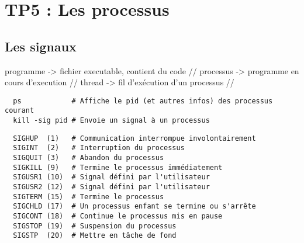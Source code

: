 \documentclass{article}
\begin{document}
\section{TP5 : Les processus}

\subsection{Les signaux}

programme -> fichier executable, contient du code //
processus -> programme en cours d'execution //
thread -> fil d'exécution d'un processus //

\begin{verbatim}
  ps            # Affiche le pid (et autres infos) des processus courant
  kill -sig pid # Envoie un signal à un processus
\end{verbatim}

\begin{verbatim}
  SIGHUP  (1)   # Communication interrompue involontairement
  SIGINT  (2)   # Interruption du processus
  SIGQUIT (3)   # Abandon du processus
  SIGKILL (9)   # Termine le processus immédiatement
  SIGUSR1 (10)  # Signal défini par l'utilisateur
  SIGUSR2 (12)  # Signal défini par l'utilisateur
  SIGTERM (15)  # Termine le processus 
  SIGCHLD (17)  # Un processus enfant se termine ou s'arrête
  SIGCONT (18)  # Continue le processus mis en pause
  SIGSTOP (19)  # Suspension du processus
  SIGSTP  (20)  # Mettre en tâche de fond
\end{verbatim}
\end{document}
